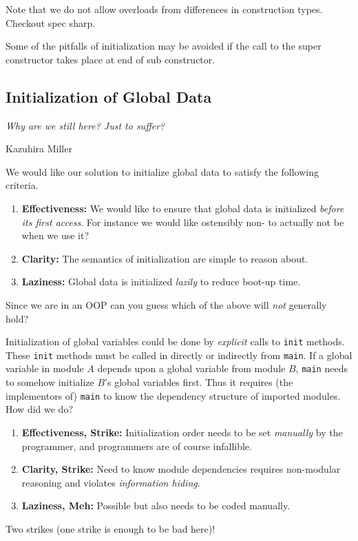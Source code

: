 \documentclass{article}
\begin{document}
Note that we do not allow overloads from differences in construction types. Checkout spec sharp.


\begin{remark}\label{remark:superatendofsub}
  Some of the pitfalls of initialization may be avoided if the call to the super constructor takes place at end of sub constructor.
\end{remark}

\subsection{Initialization of Global Data}

\epigraph{\itshape Why are we still here? Just to suffer?}{Kazuhira Miller}

\begin{definition}
  We would like our solution to initialize global data to satisfy the following criteria.
  \begin{enumerate}
  \item \textbf{Effectiveness:} We would like to ensure that global data is initialized \textit{before its first access}. For instance we would like ostensibly non-\cringe{} to actually not be \cringe{} when we use it?
  \item \textbf{Clarity:} The semantics of initialization are simple to reason about.
  \item \textbf{Laziness:} Global data is initialized \textit{lazily} to reduce boot-up time.
  \end{enumerate}
  Since we are in an OOP can you guess which of the above will \textit{not} generally hold?
\end{definition}

\begin{definition}\label{def:globalvarinitmethod}
  Initialization of global variables could be done by \textit{explicit} calls to \texttt{init} methods.
  These \texttt{init} methods must be called in directly or indirectly from \texttt{main}.
  If a global variable in module $A$ depends upon a global variable from module $B$, \texttt{main} needs to somehow initialize $B$'s global variables first.
  Thus it requires (the implementors of) \texttt{main} to know the dependency structure of imported modules.
  How did we do?
  \begin{enumerate}
  \item \textbf{Effectiveness, Strike:} Initialization order needs to be set \textit{manually} by the programmer, and programmers are of course infallible.
  \item \textbf{Clarity, Strike:} Need to know module dependencies requires non-modular reasoning and violates \textit{information hiding}.
  \item \textbf{Laziness, Meh:} Possible but also needs to be coded manually.
  \end{enumerate}
  Two strikes (one strike is enough to be bad here)!
\end{definition}
\end{document}
